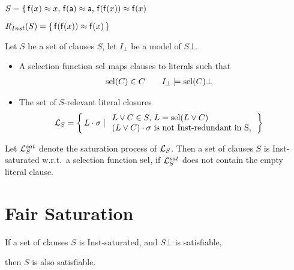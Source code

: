 \begin{example}
   \( S =
       \{ \,
       \mathsf{f}(x)\approx x,\,
       \mathsf{f}(\mathsf{a})\approx \mathsf{a},\,
       \mathsf{f}(\mathsf{f}(x))\approx\mathsf{f}(x)
       \,  \)

   \( R_{Inst}(S) = \{ \, \mathsf{f}(\mathsf{f}(x))\approx\mathsf{f}(x) \, \} \)
   \end{example}

   \begin{definition}[S-Relevance]
        Let \( S \) be a set of clauses \( S \), let \( I_\bot \) be a model of \( S\bot \).

       \begin{itemize}
           \item
        A selection function \( \operatorname{sel} \) maps clauses to literals such that
       \begin{align*}
           \operatorname{sel}(C)&\in C
            &&&
            I_\bot&\models\operatorname{sel}(C)\bot
       \end{align*}

       \item
        The set of \( S \)-relevant literal closures
       \begin{align*}
           \mathcal{L}_S &= \left \{ \, L\cdot\sigma \mid
           \begin{array}{l}
                L\lor C\in S,\,L = \operatorname{sel}(L\lor C)\\
                (L\lor C)\cdot\sigma\text{ is not Inst-redundant in S},\\
           \end{array}
           \, \right \}
       \end{align*}




   \end{itemize}
\end{definition}

\begin{definition}
    Let \( \mathcal{L}_S^{sat} \) denote the saturation process of \( \mathcal{L}_S \).
    Then a set of clauses \( S \) is Inst-saturated w.r.t.~a selection function \( \operatorname{sel} \),
            if \( \mathcal{L}_S^{sat} \) does not contain the empty literal clause.
\end{definition}

\section{Fair Saturation}
       \begin{theorem}
        If a set of clauses \( S \) is Inst-saturated,
        and \( S\bot \) is satisfiable,

        then \( S \) is also satisfiable.
       \end{theorem}

